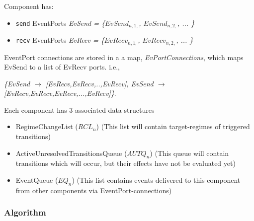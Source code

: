 \documentclass[draftspec]{ninemlspec}
\begin{document}
\newcommand{\send}[0]{\texttt{send} }
\newcommand{\recv}[0]{\texttt{recv} }

\noindent Component \CN
has:
\begin{itemize}
\item \send EventPorts \textsl{EvSend = \{$EvSend_{n,1,}$, $EvSend_{n,2,}$, ... \}}
\item \recv EventPorts \textsl{EvRecv = \{$EvRecv_{n,1,}$, $EvRecv_{n,2,}$, ... \}}
\end{itemize}

\noindent EventPort connections are stored in a a map,
\textsl{EvPortConnections}, which maps EvSend to a list of EvRecv ports. i.e.,

\textsl{\{EvSend $\rightarrow$ [EvRecv,EvRecv,..,EvRecv], EvSend $\rightarrow$
[EvRecv,EvRecv,EvRecv,...,EvRecv]\}}.

\newcommand{\RCLn}{$RCL_n$}
\newcommand{\AUTQn}{$AUTQ_n$}
\newcommand{\EQn}{$EQ_n$}

\noindent Each component has 3 associated data structures
\begin{itemize}
\item RegimeChangeList (\RCLn) (This list will contain target-regimes of
triggered transitions)
\item ActiveUnresolvedTransitionsQueue (\AUTQn) (This queue will
contain transitions which will occur, but their effects have not be
evaluated yet)
\item EventQueue (\EQn) (This list contains events delivered to this
component from other components via EventPort-connections)
\end{itemize}

\subsubsection{Algorithm}
\end{document}
